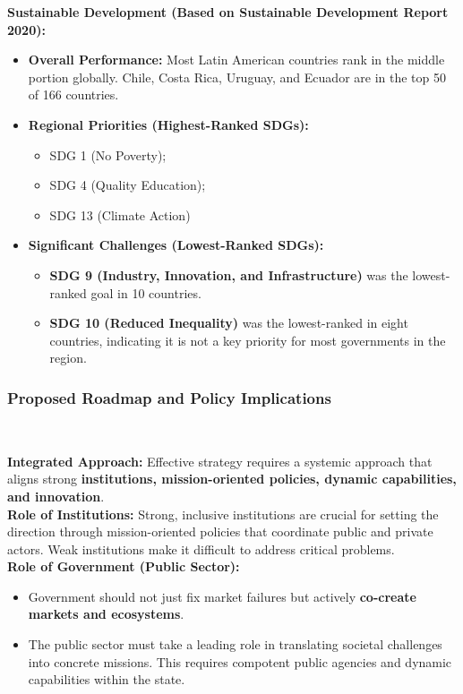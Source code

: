 \documentclass{article}
\begin{document}
    \noindent
\textbf{Sustainable Development (Based on Sustainable Development Report 2020):}
    \begin{itemize}
        \item \textbf{Overall Performance:} Most Latin American countries
        rank in the middle portion globally. Chile, Costa Rica, Uruguay, and
        Ecuador are in the top 50 of 166 countries.
        \item \textbf{Regional Priorities (Highest-Ranked SDGs):}
        \begin{itemize}
            \item SDG 1 (No Poverty);
            \item SDG 4 (Quality Education);
            \item SDG 13 (Climate Action)
        \end{itemize}
        \item \textbf{Significant Challenges (Lowest-Ranked SDGs):}
        \begin{itemize}
            \item \textbf{SDG 9 (Industry, Innovation, and Infrastructure)}
            was the lowest-ranked goal in 10 countries.
            \item \textbf{SDG 10 (Reduced Inequality)} was the lowest-ranked
            in eight countries, indicating it is not a key priority for most
            governments in the region.
        \end{itemize}
    \end{itemize}

    \subsubsection{Proposed Roadmap and Policy Implications}\

    \noindent \textbf{Integrated Approach:} Effective strategy requires a
systemic approach that aligns strong
\textbf{institutions, mission-oriented policies, dynamic capabilities, and innovation}.\\

    \noindent \textbf{Role of Institutions:} Strong, inclusive institutions
are crucial for setting the direction through mission-oriented policies that
coordinate public and private actors. Weak institutions make it difficult to
address critical problems.\\

    \noindent \textbf{Role of Government (Public Sector):}
    \begin{itemize}
        \item Government should not just fix market failures but actively \textbf{co-create markets and ecosystems}.
        \item The public sector must take a leading role in translating
        societal challenges into concrete missions. This requires compotent
        public agencies and dynamic capabilities within the state.
    \end{itemize}
\end{document}
